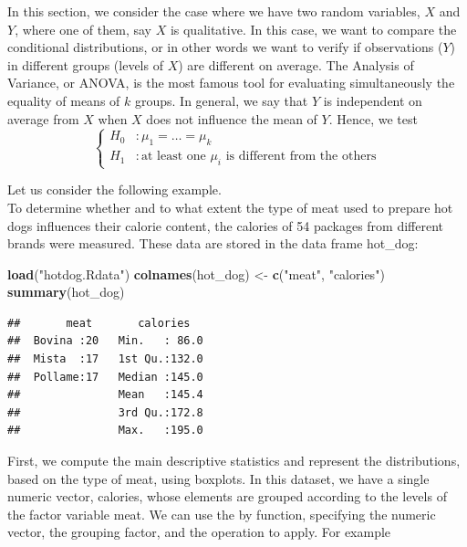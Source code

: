 \documentclass[
]{article}
\newenvironment{Shaded}{\begin{snugshade}}{\end{snugshade}}
\newcommand{\FunctionTok}[1]{\textcolor[rgb]{0.13,0.29,0.53}{\textbf{#1}}}
\newcommand{\NormalTok}[1]{#1}
\newcommand{\OtherTok}[1]{\textcolor[rgb]{0.56,0.35,0.01}{#1}}
\newcommand{\StringTok}[1]{\textcolor[rgb]{0.31,0.60,0.02}{#1}}
\begin{document}
In this section, we consider the case where we have two random
variables, \(X\) and \(Y\), where one of them, say \(X\) is qualitative.
In this case, we want to compare the conditional distributions, or in
other words we want to verify if observations (\(Y\)) in different
groups (levels of \(X\)) are different on average. The Analysis of
Variance, or ANOVA, is the most famous tool for evaluating
simultaneously the equality of means of \(k\) groups. In general, we say
that \(Y\) is independent on average from \(X\) when \(X\) does not
influence the mean of \(Y\). Hence, we test \[
\begin{cases}
H_0 &: \mu_1 = \ldots = \mu_k \\ 
H_1 &: \text{at least one }\mu_i\text{ is different from the others}
\end{cases}
\]

Let us consider the following example.\\
To determine whether and to what extent the type of meat used to prepare
hot dogs influences their calorie content, the calories of 54 packages
from different brands were measured. These data are stored in the data
frame hot\_dog:

\begin{Shaded}
\begin{Highlighting}[]
\FunctionTok{load}\NormalTok{(}\StringTok{"hotdog.Rdata"}\NormalTok{)}
\FunctionTok{colnames}\NormalTok{(hot\_dog) }\OtherTok{\textless{}{-}} \FunctionTok{c}\NormalTok{(}\StringTok{"meat"}\NormalTok{, }\StringTok{"calories"}\NormalTok{)}
\FunctionTok{summary}\NormalTok{(hot\_dog)}
\end{Highlighting}
\end{Shaded}

\begin{verbatim}
##       meat       calories    
##  Bovina :20   Min.   : 86.0  
##  Mista  :17   1st Qu.:132.0  
##  Pollame:17   Median :145.0  
##               Mean   :145.4  
##               3rd Qu.:172.8  
##               Max.   :195.0
\end{verbatim}

First, we compute the main descriptive statistics and represent the
distributions, based on the type of meat, using boxplots. In this
dataset, we have a single numeric vector, calories, whose elements are
grouped according to the levels of the factor variable meat. We can use
the by function, specifying the numeric vector, the grouping factor, and
the operation to apply. For example
\end{document}
